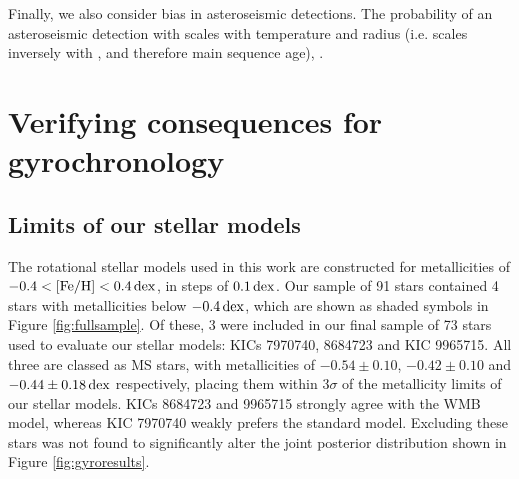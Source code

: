 Finally, we also consider bias in asteroseismic detections. The probability of an asteroseismic detection with \kepler scales with temperature and radius (i.e. scales inversely with \logg, and therefore main sequence age),  \cite{m_chaplin+2011, m_schofield+2019}. 

\section{Verifying consequences for gyrochronology}
\subsection{Limits of our stellar models}\label{ssec:limits}
The rotational stellar models used in this work \cite{m_vansaders+2019} are constructed for metallicities of $-0.4 < \rm{[Fe/H]} < 0.4\, \rm{dex}$, in steps of $0.1\, \rm {dex}$. Our sample of 91 stars contained 4 stars with metallicities below $-0.4\, \rm{dex}$, which are shown as shaded symbols in Figure \ref{fig:fullsample}. Of these, 3 were included in our final sample of 73 stars used to evaluate our stellar models: KICs 7970740, 8684723 and KIC 9965715. All three are classed as MS stars, with metallicities of $-0.54 \pm 0.10$, $-0.42 \pm 0.10$ and $-0.44 \pm 0.18\, \rm {dex}$ respectively, placing them within $3\sigma$ of the metallicity limits of our stellar models. KICs 8684723 and 9965715 strongly agree with the WMB model, whereas KIC 7970740 weakly prefers the standard model. Excluding these stars was not found to significantly alter the joint posterior distribution shown in Figure \ref{fig:gyroresults}.

